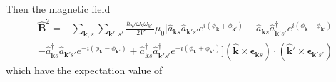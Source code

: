 \documentclass[../../../main.tex]{subfiles}
\begin{document}
Then the magnetic field
\begin{multline*}
  \hat{\mathbf{B}}^2
  =  - \sum_{\mathbf{k},s} \sum_{\mathbf{k}',s'} \frac{\hbar \sqrt{\omega_k \omega_{k'}}}{2 V} \mu_0
  \bigg[ \hat{a}_{\mathbf{k }s} \hat{a}_{\mathbf{k }'s'}  e ^{i(\phi_{\mathbf{k }} +\phi_{\mathbf{k }'})}
    -\hat{a}_{\mathbf{k }s} \hat{a}^\dagger_{\mathbf{k }'s'} e ^{i(\phi_{\mathbf{k }}-\phi_{\mathbf{k }'})} \\
    -\hat{a}_{\mathbf{k }s}^\dagger \hat{a}_{\mathbf{k }'s'}e ^{-i(\phi_{\mathbf{k }}-\phi_{\mathbf{k }'})}
    +\hat{a}^\dagger_{\mathbf{k }s} \hat{a}^\dagger_{\mathbf{k }'s'} e ^{-i(\phi_{\mathbf{k }}+\phi_{\mathbf{k }'})} \bigg]
  (\mathbf{\hat{k}} \times \boldsymbol{\epsilon}_{\mathbf{k}s}) \cdot (\mathbf{\hat{k}'} \times \boldsymbol{\epsilon}_{\mathbf{k}'s'})
\end{multline*}
which have the expectation value of
\end{document}
